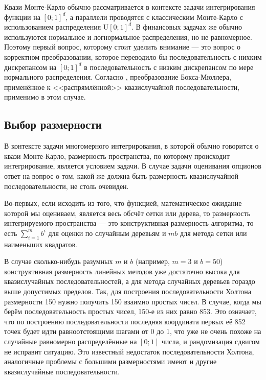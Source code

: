\documentclass[specialist,
               substylefile = ../spbu.rtx,
               subf,href,colorlinks=true, 10pt]{disser}
\begin{document}
Квази Монте-Карло обычно рассматривается в контексте задачи интегрирования функции на $\left[0;1\right]^d$, а параллели проводятся с классическим Монте-Карло с использованием распределения $\mathrm U\left[0;1\right]^d$. В финансовых задачах же обычно используются нормальное и логнормальное распределения, но не равномерное. Поэтому первый вопрос, которому стоит уделить внимание --- это вопрос о корректном преобразовании, которое переводило бы последовательность с нихким дискрепансом на $\left[0;1\right]^d$ в последовательность с низким дискрепансом по мере нормального распределения. Согласно \cite{Oekten2011}, преобразование Бокса-Мюллера, применённое к <<распрямлённой>> квазислучайной последовательности, применимо в этом случае.


\subsection{Выбор размерности} %
\label{sub:choice_of_dimension}

В контексте задачи многомерного интегрирования, в которой обычно говорится о квази Монте-Карло, размерность пространства, по которому происходит интегрирование, является условием задачи. В случае задачи оценивания опционов ответ на вопрос о том, какой же должна быть размерность квазислучайной последовательности, не столь очевиден.

Во-первых, если исходить из того, что функцией, математическое ожидание которой мы оцениваем, является весь обсчёт сетки или дерева, то размерность интегрируемого пространства --- это конструктивная размерность алгоритма, то есть $\sum_{i=1}^m b^i$ для оценки по случайным деревьям и $mb$ для метода сетки или наименьших квадратов.

В случае сколько-нибудь разумных $m$ и $b$ (например, $m = 3$ и $b = 50$) конструктивная размерность линейных методов уже достаточно высока для квазислучайных последовательностей, а для метода случайных деревьев гораздо выше допустимых пределов. Так, для построения последовательности Холтона размерности 150 нужно получить 150 взаимно простых чисел. В случае, когда мы берём последовательность простых чисел, 150-е из них равно 853. Это означает, что по построению последовательности последняя координата первых её 852 точек будет идти равноотстоящими шагами от 0 до 1, что уже не очень похоже на случайные равномерно распределённые на $\left[0; 1\right]$ числа, и рандомизация сдвигом не исправит ситуацию. Это известный недостаток последовательности Холтона, аналогичные проблемы с большими размерностями имеют и другие квазислучайные последовательности.
\end{document}
